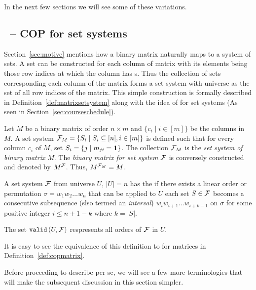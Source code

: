 In the next few sections we will see some of these variations.


\subsection{\PQRtree\ --  COP for set systems}
\label{sec:surveycertalgo}

Section~\ref{sec:motive} mentions how a binary matrix naturally maps
to a system of sets.  A set can be constructed for each column of
matrix with its elements being those row indices at which the column
has \un s. Thus the collection of sets corresponding each column of
the matrix forms a set system with universe as the set of all row
indices of the matrix.  This simple construction is formally described
in Definition~\ref{def:matrixsetsystem} along with the idea of \cop
for set systems (As seen in Section~\ref{sec:courseschedule}).

\begin{definition}%
  \label{def:matrixsetsystem}%
  Let $M$ be a binary matrix of order $n \times m$ and $\{c_i \mid i
  \in [m]\}$ be the columns in $M$.  A set system ${\cal F}_{M} = \{S_i
  \mid S_i \subseteq [n], i \in [m]\}$ is defined such that for every
  column $c_i$ of $M$, set $S_i = \{j \mid m_{ji} = \textbf{1} \}$. The
  collection ${\cal F}_M$ is the {\em set system of binary matrix} $M$. The
  {\em binary matrix for set system} ${\cal F}$ is conversely constructed
  and denoted by $M^{\cal F}$. Thus, $M^{{\cal F}_M} = M$.%
  \par\noindent%
  A set system ${\cal F}$ from universe $U$, $|U| = n$ has the {\em \cop}
  if there exists a linear order or permutation $\sigma = w_1w_2\ldots
  w_n$ that can be applied to $U$ \stt each set $S \in {\cal F}$ becomes a
  consecutive subsequence (slso termed an {\em interval})
  $w_{i}w_{i+1}\ldots w_{i+k-1}$ on $\sigma$ for some positive integer
  $i \le n+1-k$ where $k = |S|$.
  \par\noindent%
  The set ${\tt valid}\left(U,{\cal F}\right)$ respresents all \COP orders of ${\cal F}$ in $U$.
  \dstop
\end{definition}

It is easy to see the equivalence of this definition to \COP for
matrices in Definition~\ref{def:copmatrix}.

Before proceeding to describe \PQRtree per se, we will see a few more
terminologies that will make the subsequent discussion in this section
simpler.

